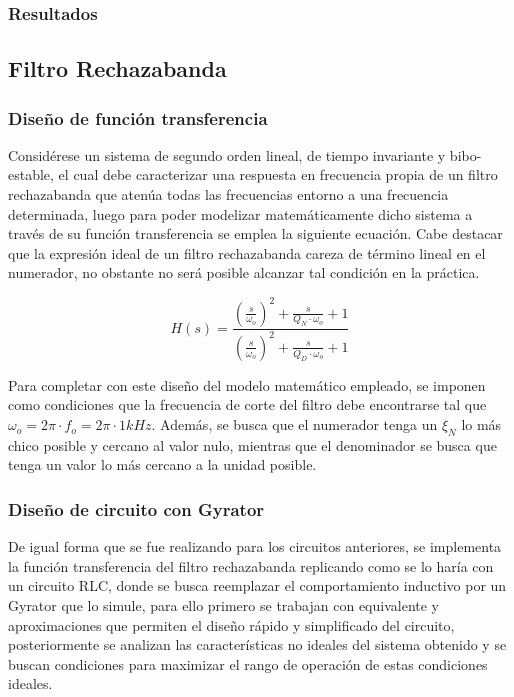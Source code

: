 \subsubsection{Resultados}

\subsection{Filtro Rechazabanda}
\subsubsection{Dise\~no de funci\'on transferencia}
Consid\'erese un sistema de segundo orden lineal, de tiempo invariante y bibo-estable, el cual debe caracterizar una respuesta en frecuencia propia de un filtro rechazabanda que aten\'ua todas las frecuencias entorno a una frecuencia determinada,
luego para poder modelizar matem\'aticamente dicho sistema a trav\'es de su funci\'on transferencia se emplea la siguiente ecuaci\'on. Cabe destacar que la expresi\'on ideal de un filtro rechazabanda careza de t\'ermino lineal en el numerador, no obstante
no ser\'a posible alcanzar tal condici\'on en la pr\'actica.

\begin{equation}
    H(s) = \frac{\left( \frac{s}{\omega_o} \right)^{2} + \frac{s}{Q_N \cdot \omega_o} + 1}{\left( \frac{s}{\omega_o} \right)^{2} + \frac{s}{Q_D \cdot \omega_o} + 1}    
\end{equation}

Para completar con este dise\~no del modelo matem\'atico empleado, se imponen como condiciones que la frecuencia de corte del filtro debe encontrarse tal que $\omega_o = 2\pi \cdot f_o =  2\pi \cdot 1kHz$. Adem\'as,
se busca que el numerador tenga un $\xi_N$ lo m\'as chico posible y cercano al valor nulo, mientras que el denominador se busca que tenga un valor lo m\'as cercano a la unidad posible.

\subsubsection{Dise\~no de circuito con Gyrator}
De igual forma que se fue realizando para los circuitos anteriores, se implementa la funci\'on transferencia del filtro rechazabanda replicando como se lo har\'ia con un circuito RLC, donde se busca reemplazar el comportamiento inductivo
por un Gyrator que lo simule, para ello primero se trabajan con equivalente y aproximaciones que permiten el dise\~no r\'apido y simplificado del circuito, posteriormente se analizan las caracter\'isticas no ideales del sistema obtenido y se buscan 
condiciones para maximizar el rango de operaci\'on de estas condiciones ideales.

